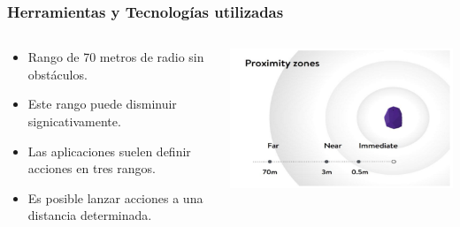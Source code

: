 \begin{frame}
	\frametitle{Herramientas y Tecnologías utilizadas}
	\begin{columns}
			\begin{column}{0.6\textwidth}
					\begin{itemize}
						\item {Rango de 70 metros de radio sin obstáculos.}
						\item {Este rango puede disminuir signicativamente.}
						\item {Las aplicaciones suelen definir acciones en tres rangos.}
						\item {Es posible lanzar acciones a una distancia determinada.}
					\end{itemize}
				\endblock{}
			\end{column}
			\begin{column}{0.4\textwidth}
				\vfill 
					\begin{center}
						\includegraphics[width=0.8\linewidth]{Images/beaconsRange}
					\end{center}
			\end{column}
	\end{columns}
\end{frame}


